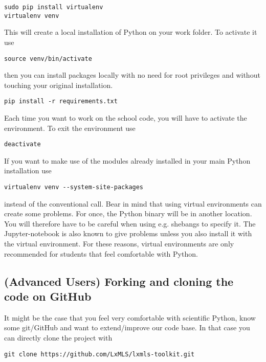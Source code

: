 \begin{verbatim}
sudo pip install virtualenv
virtualenv venv 
\end{verbatim}

\noindent This will create a local installation of Python on your work folder. To activate it use 

\begin{verbatim}
source venv/bin/activate
\end{verbatim}

\noindent then you can install packages locally with no need for root privileges and without touching your original installation.

\begin{verbatim}
pip install -r requirements.txt
\end{verbatim}

\noindent Each time you want to work on the school code, you will have to activate the environment. To exit the environment use 

\begin{verbatim}
deactivate
\end{verbatim}

\noindent If you want to make use of the modules already installed in your main Python installation use

\begin{verbatim}
virtualenv venv --system-site-packages
\end{verbatim}

instead of the conventional call. Bear in mind that using virtual environments can create some problems. For once, the Python binary will be in another location. You will therefore have to be careful when using e.g. shebangs to specify it. The Jupyter-notebook is also known to give problems unless you also install it with the virtual environment. For these reasons, virtual environments are only recommended for students that feel comfortable with Python. 

\subsection{(Advanced Users) Forking and cloning the code on GitHub}

It might be the case that you feel very comfortable with scientific Python, know some git/GitHub and want to extend/improve our code base. In that case you can directly clone the project with

\begin{verbatim}
git clone https://github.com/LxMLS/lxmls-toolkit.git 
\end{verbatim}

